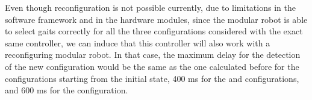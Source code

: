 Even though reconfiguration is not possible currently, due to limitations in the software framework and in the hardware modules, since the modular robot is able to select gaits correctly for all the three configurations considered with the exact same controller, we can induce that this controller will also work with a reconfiguring modular robot. In that case, the maximum delay for the detection of the new configuration would be the same as the one calculated before for the configurations starting from the initial state, 400 ms for the \emph{\robotSeven} and \emph{\robotNine} configurations, and 600 ms for the \emph{\robotEleven} configuration.